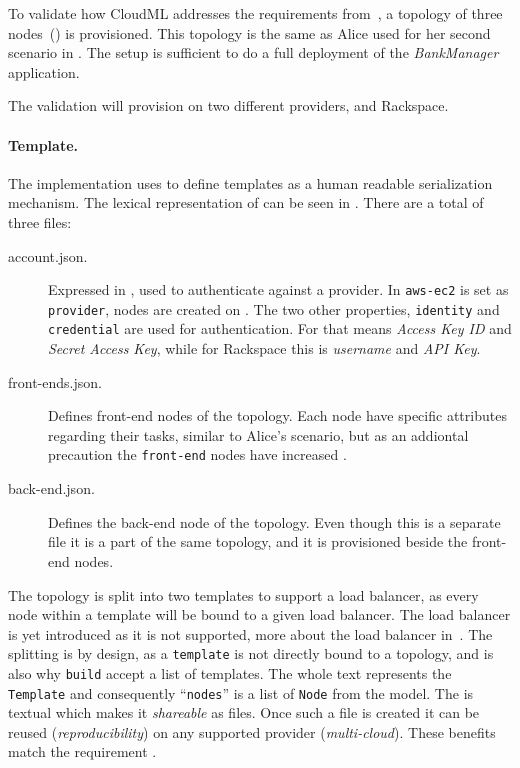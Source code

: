 
To validate how CloudML addresses the requirements from~,
a topology of three nodes~() is provisioned.
This topology is the same as Alice used for her second scenario in .
The setup is sufficient to do a full deployment of the \emph{BankManager} application.

The validation will provision on two different providers,  and Rackspace.

\paragraph{Template.}



The implementation uses  to define templates as a human readable serialization mechanism.
The lexical representation of  can be seen in .
There are a total of three files:
\begin{description}
  \item[account.json.]
    Expressed in , used to authenticate against a provider.
    In  \texttt{aws-ec2} is set as \texttt{provider},
    \ie nodes are created on .
    The two other properties, \texttt{identity} and \texttt{credential} are used for authentication.
    For  that means \emph{Access Key ID} and \emph{Secret Access Key},
    while for Rackspace this is \emph{username} and \emph{API Key}.
  \item[front-ends.json.]
    Defines front-end nodes of the topology.
    Each node have specific attributes regarding their tasks, similar to Alice's scenario,
    but as an addiontal precaution the \texttt{front-end} nodes have increased .
  \item[back-end.json.]
    Defines the back-end node of the topology.
    Even though this is a separate file it is a part of the same topology,
    and it is provisioned beside the front-end nodes.
\end{description}
The topology is split into two templates to support a load balancer,
as every node within a template will be bound to a given load balancer.
The load balancer is yet introduced as it is not supported, more about the load balancer in~.
The splitting is by design, as a \texttt{template} is not directly bound to a topology,
and is also why \texttt{build} accept a list of templates.
The whole text represents the \texttt{Template} and consequently 
``\texttt{nodes}'' is a list of \texttt{Node} from the model.
The  is textual which makes it \emph{shareable} as files.
Once such a file is created it can be reused (\emph{reproducibility}) 
on any supported provider (\emph{multi-cloud}).
These benefits match the requirement .

